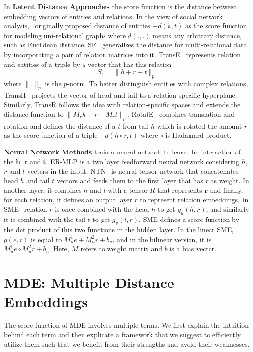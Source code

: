\documentclass{ecai}
\begin{document}
In \textbf{Latent Distance Approaches} the score function is the distance between embedding vectors of entities and relations. In the view of social network analysis,~\cite{hoff2002latent} originally proposed distance of entities $-d(h, t)$ as the score function for modeling uni-relational graphs where $d(., .)$ means any arbitrary distance, such as Euclidean distance. SE~\cite{bordes2011learning} generalizes the distance for multi-relational data by incorporating a pair of relation matrices into it. TransE~\cite{bordes2013translating} represents relation and entities of a triple by a vector that has this relation
\begin{equation}\label{eq:1}
    S_1 = \parallel h+r-t \parallel_p
\end{equation}
where $\parallel . \parallel_p$ is the $p$-norm. To better distinguish entities with complex relations, TransH~\cite{wang2014knowledge} projects the vector of head and tail to a relation-specific hyperplane. Similarly, TransR follows the idea with relation-specific spaces and extends the distance function to $\parallel M_r h+r- M_r t \parallel_p$. RotatE~\cite{sun2019rotate} combines translation and rotation and defines the distance of a $t$ from tail $h$ which is rotated the amount $r$ as the score function of a triple $-d(h \circ r, t)$ where $\circ$ is Hadamard product.

\textbf{Neural Network Methods} train a neural network to learn the interaction of the \textbf{h}, \textbf{r} and \textbf{t}. ER-MLP \cite{dong2014knowledge} is a two layer feedforward neural network considering $h$, $r$ and $t$ vectors in the input. NTN~\cite{socher2013reasoning} is neural tensor network that concatenates head $h$ and tail $t$ vectors and feeds them to the first layer that has $r$ as weight. In another layer, it combines $h$ and $t$ with a tensor $R$ that represents $\textbf{r}$ and finally, for each relation, it defines an output layer $r$ to represent relation embeddings. In SME~\cite{bordes2014semantic} relation $r$ is once combined with the head $h$ to get $g_u(h, r)$, and similarly it is combined with the tail $t$ to get $g_v(t, r)$. SME defines a score function by the dot product of this two functions in the hidden layer. In the linear SME, $g(e,r)$ is equal to $M^1_u e+ M^2_u r + b_u$, and in the bilinear version, it is $M^1_u e \circ M^2_u r + b_u$. Here, $M$ refers to weight matrix and $b$ is a bias vector.

\section{MDE: Multiple Distance Embeddings}
\label{sec:MDE Multiple Distance Embeddings}
The score function of MDE involves multiple terms. We first explain the intuition behind each term and then explicate a framework that we suggest to efficiently utilize them such that we benefit from their strengths and avoid their weaknesses.
\end{document}

